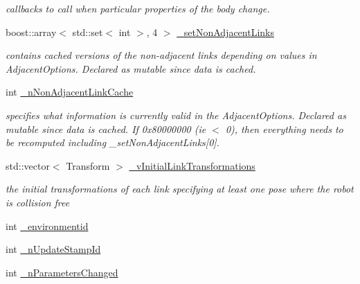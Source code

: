\begin{DoxyCompactItemize}
\begin{DoxyCompactList}\small\item\em callbacks to call when particular properties of the body change. \item\end{DoxyCompactList}\item 
\hypertarget{classOpenRAVE_1_1KinBody_a1e6a02a45812548a34f578af0c8a301e}{
boost::array$<$ std::set$<$ int $>$, 4 $>$ \hyperlink{classOpenRAVE_1_1KinBody_a1e6a02a45812548a34f578af0c8a301e}{\_\-setNonAdjacentLinks}}
\label{classOpenRAVE_1_1KinBody_a1e6a02a45812548a34f578af0c8a301e}

\begin{DoxyCompactList}\small\item\em contains cached versions of the non-\/adjacent links depending on values in AdjacentOptions. Declared as mutable since data is cached. \item\end{DoxyCompactList}\item 
\hypertarget{classOpenRAVE_1_1KinBody_a5b371595d16c6e862f4f675f03dffba4}{
int \hyperlink{classOpenRAVE_1_1KinBody_a5b371595d16c6e862f4f675f03dffba4}{\_\-nNonAdjacentLinkCache}}
\label{classOpenRAVE_1_1KinBody_a5b371595d16c6e862f4f675f03dffba4}

\begin{DoxyCompactList}\small\item\em specifies what information is currently valid in the AdjacentOptions. Declared as mutable since data is cached. If 0x80000000 (ie $<$ 0), then everything needs to be recomputed including \_\-setNonAdjacentLinks\mbox{[}0\mbox{]}. \item\end{DoxyCompactList}\item 
\hypertarget{classOpenRAVE_1_1KinBody_a9945fd1c6a580218fe969ee3bf77097f}{
std::vector$<$ Transform $>$ \hyperlink{classOpenRAVE_1_1KinBody_a9945fd1c6a580218fe969ee3bf77097f}{\_\-vInitialLinkTransformations}}
\label{classOpenRAVE_1_1KinBody_a9945fd1c6a580218fe969ee3bf77097f}

\begin{DoxyCompactList}\small\item\em the initial transformations of each link specifying at least one pose where the robot is collision free \item\end{DoxyCompactList}\item 
int \hyperlink{classOpenRAVE_1_1KinBody_a0386692fd7704da6e79775fa09a4b685}{\_\-environmentid}
\item 
int \hyperlink{classOpenRAVE_1_1KinBody_abce08eaa134f87c6d13f4d23749a61b9}{\_\-nUpdateStampId}
\item 
\hypertarget{classOpenRAVE_1_1KinBody_a7e9098feb28e312721a58a360989ec20}{
int \hyperlink{classOpenRAVE_1_1KinBody_a7e9098feb28e312721a58a360989ec20}{\_\-nParametersChanged}}
\label{classOpenRAVE_1_1KinBody_a7e9098feb28e312721a58a360989ec20}


\end{DoxyCompactItemize}
